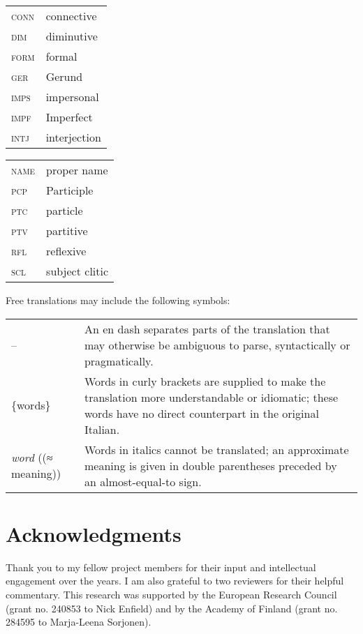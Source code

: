\documentclass[output=paper,modfonts]{langscibook}
\begin{document}
\noindent
\begin{tabularx}{.45\textwidth}{>{\scshape}lQ}
conn & connective\\
dim & diminutive\\
form & formal\\
ger & Gerund\\
imps & impersonal\\
impf & Imperfect\\
intj & interjection\\
\end{tabularx}
\begin{tabularx}{.45\textwidth}{>{\scshape}lQ}
name & proper name\\
pcp & Participle\\
ptc & particle\\
ptv & partitive\\
rfl & reflexive\\
scl & subject clitic\\
\end{tabularx}\bigskip

\noindent
Free translations may include the following symbols:\medskip

\noindent
\begin{tabularx}{\textwidth}{lX}
-- & An en dash separates parts of the translation that may otherwise be ambiguous to parse, syntactically or pragmatically. \\
\{words\} &	Words in curly brackets are supplied to make the translation more understandable or idiomatic; these words have no direct counterpart in the original Italian. \\
\textit{word} ((≈ meaning)) & Words in italics cannot be translated; an approximate meaning is given in double parentheses preceded by an almost-equal-to sign. \\
\end{tabularx}

\section*{Acknowledgments}

Thank you to my fellow project members for their input and intellectual engagement over the years. I am also grateful to two reviewers for their helpful commentary. This research was supported by the European Research Council (grant no. 240853 to Nick Enfield) and by the Academy of Finland (grant no. 284595 to Marja-Leena Sorjonen).

\sloppy
\printbibliography[heading=subbibliography,notkeyword=this]
\end{document}

